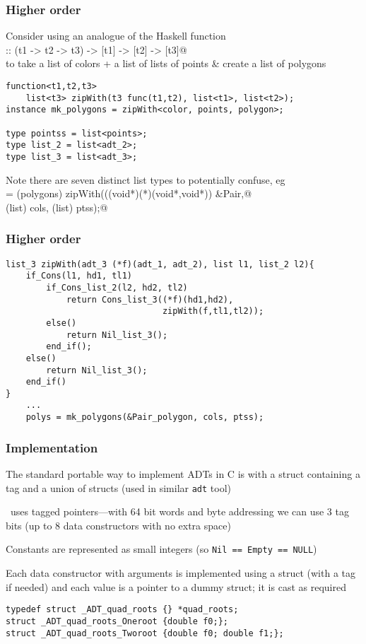 \documentclass[t,t]{beamer}
\begin{document}
\begin{frame}[fragile]
\frametitle{Higher order }
Consider using an analogue of the Haskell function\\
\verb@zipWith :: (t1 -> t2 -> t3) -> [t1] -> [t2] -> [t3]@\\
to take a list of colors + a list of lists
of points \& create a list of polygons
\begin{verbatim}
function<t1,t2,t3>
    list<t3> zipWith(t3 func(t1,t2), list<t1>, list<t2>);
instance mk_polygons = zipWith<color, points, polygon>;

type pointss = list<points>;
type list_2 = list<adt_2>;
type list_3 = list<adt_3>;
\end{verbatim}
Note there are seven distinct list types to potentially
confuse, eg\\
\verb@polys = (polygons) zipWith(((void*)(*)(void*,void*)) &Pair,@\\
\verb@                                (list) cols, (list) ptss);@
\end{frame}

\begin{frame}[fragile]
\frametitle{Higher order }
\begin{verbatim}
list_3 zipWith(adt_3 (*f)(adt_1, adt_2), list l1, list_2 l2){
    if_Cons(l1, hd1, tl1)
        if_Cons_list_2(l2, hd2, tl2)
            return Cons_list_3((*f)(hd1,hd2),
                               zipWith(f,tl1,tl2));
        else()
            return Nil_list_3();
        end_if();
    else()
        return Nil_list_3();
    end_if()
}
    ...
    polys = mk_polygons(&Pair_polygon, cols, ptss);
\end{verbatim}
\end{frame}

\begin{frame}[fragile]
\frametitle{Implementation}
The standard portable way to implement ADTs in C is with a struct
containing a tag and a union of structs
(used in similar \texttt{adt} tool)

\Adtpp\ uses tagged pointers---with 64 bit words and byte
addressing we can use 3 tag bits (up to 8
data constructors with no extra space)

Constants are represented as small integers (so \texttt{Nil ==
Empty == NULL})

Each data constructor with arguments is implemented using a struct
(with a tag if needed) and each value is a pointer to a dummy struct;
it is cast as required

\begin{verbatim}
typedef struct _ADT_quad_roots {} *quad_roots;
struct _ADT_quad_roots_Oneroot {double f0;};
struct _ADT_quad_roots_Tworoot {double f0; double f1;};
\end{verbatim}
\end{frame}
\end{document}
